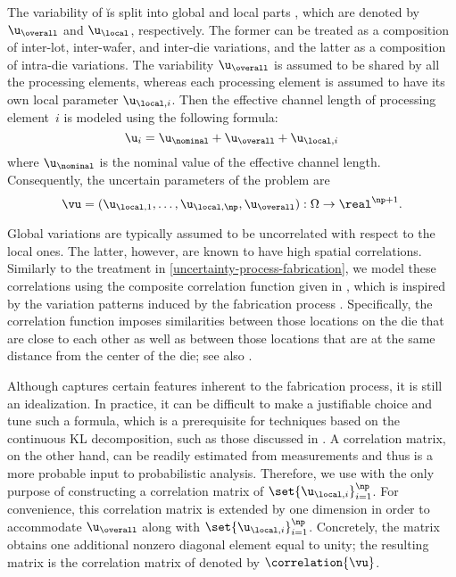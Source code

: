 The variability of \u is split into global and local parts \cite{shen2009,
chandra2010, juan2012}, which are denoted by $\u_\overall$ and $\u_\local$,
respectively. The former can be treated as a composition of inter-lot,
inter-wafer, and inter-die variations, and the latter as a composition of
intra-die variations. The variability $\u_\overall$ is assumed to be shared by
all the \np processing elements, whereas each processing element is assumed to
have its own local parameter $\u_{\local, i}$. Then the effective channel length
of processing element~$i$ is modeled using the following formula:
\[
  \u_i = \u_\nominal + \u_\overall + \u_{\local, i}
\]
where $\u_\nominal$ is the nominal value of the effective channel length.
Consequently, the uncertain parameters of the problem are
\[
  \vu = (\u_{\local, 1}, \dotsc, \u_{\local, \np}, \u_\overall): \Omega \to \real^{\np + 1}.
\]

Global variations are typically assumed to be uncorrelated with respect to the
local ones. The latter, however, are known to have high spatial correlations.
Similarly to the treatment in \cref{uncertainty-process-fabrication}, we model
these correlations using the composite correlation function given in
, which is inspired by the variation patterns induced by
the fabrication process \cite{friedberg2005, chandrakasan2000, cheng2011}.
Specifically, the correlation function imposes similarities between those
locations on the die that are close to each other as well as between those
locations that are at the same distance from the center of the die; see also
\cite{ghanem1991, ghanta2006, bhardwaj2008, huang2009a, lee2013}.

Although  captures certain features inherent to the
fabrication process, it is still an idealization. In practice, it can be
difficult to make a justifiable choice and tune such a formula, which is a
prerequisite for techniques based on the continuous \ac{KL} decomposition, such
as those discussed in . A correlation matrix, on the other
hand, can be readily estimated from measurements and thus is a more probable
input to probabilistic analysis. Therefore, we use  with
the only purpose of constructing a correlation matrix of $\set{\u_{\local,
i}}_{i = 1}^\np$. For convenience, this correlation matrix is extended by one
dimension in order to accommodate $\u_\overall$ along with $\set{\u_{\local,
i}}_{i = 1}^\np$. Concretely, the matrix obtains one additional nonzero diagonal
element equal to unity; the resulting matrix is the correlation matrix of \vu
denoted by $\correlation{\vu}$.

